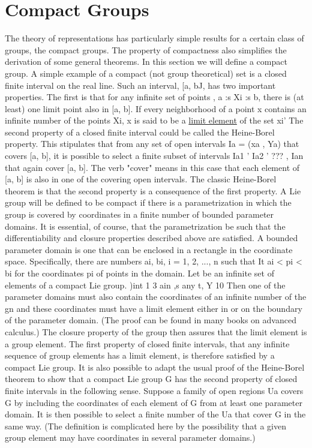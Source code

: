 \section[Compact Groups]{Compact Groups}

The theory of representations has particularly simple results for a certain class of groups, the compact groups. The property of compactness also simplifies the derivation of some general theorems.
In this section we will define a compact group.
A simple example of a compact (not group theoretical) set is a closed finite interval on the real line. Such an interval, [a, bJ, has two important properties. The first is that for any infinite set of points  , a :s Xi :s b, there is (at least) one limit point also in
[a, b]. If every neighborhood of a point x contains an infinite number of the points Xi, x is said to be a \uline{limit element} of the set {xi}' The second property of a closed finite interval could be called the Heine-Borel property. This stipulates that from any set of open intervals Ia = (xa , Ya) that covers [a, b], it is possible to select a finite subset of intervals Ia1 ' Ia2 ' ??? , Ian that again cover [a, b]. The verb "cover" means in this case that each element of [a, b] is also in one of the covering open intervals. The classic Heine-Borel theorem is that the second property is a consequence of the first property.
A Lie group will be defined to be compact if there is a parametrization in which the group is covered by coordinates in a finite number of bounded parameter domains. It is essential, of course, that the parametrization be such that the differentiability and closure properties described above are satisfied. A bounded parameter domain is one that can be enclosed in a rectangle in the coordinate space. Specifically, there are numbers ai, bi, i = 1, 2, ..., n such that
It ai < pi < bi for the coordinates pi of points in the domain.
Let  be an infinite set of elements of a compact Lie group.
)int
1
3
ain ,s
any
t,
Y 10
Then one of the parameter domains must also contain the coordinates of an infinite number of the gn and these coordinates must have a limit element either in or on the boundary of the parameter domain. (The proof can be found in many books on advanced calculus.) The closure property of the group then assures that the limit element is
a group element. The first property of closed finite intervals, that any infinite sequence of group elements has a limit element, is therefore satisfied by a compact Lie group.
It is also possible to adapt the usual proof of the Heine-Borel theorem to show that a compact Lie group G has the second property of closed finite intervals in the following sense. Suppose a family of open regions Ua covers G by including the coordinates of each element of G from at least one parameter domain. It is then possible to select a finite number of the Ua that cover G in the same way. (The definition is complicated here by the possibility that a given group element may have coordinates in several parameter domains.)

